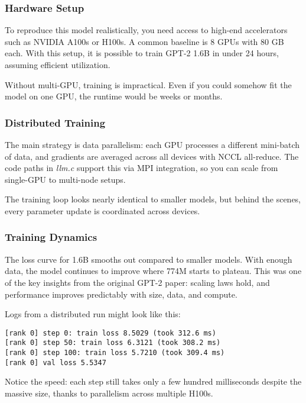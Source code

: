 \documentclass[
  letterpaper,
  DIV=11,
  numbers=noendperiod]{scrreprt}
\begin{document}
\subsubsection{Hardware Setup}\label{hardware-setup}

To reproduce this model realistically, you need access to high-end
accelerators such as NVIDIA A100s or H100s. A common baseline is 8 GPUs
with 80 GB each. With this setup, it is possible to train GPT-2 1.6B in
under 24 hours, assuming efficient utilization.

Without multi-GPU, training is impractical. Even if you could somehow
fit the model on one GPU, the runtime would be weeks or months.

\subsubsection{Distributed Training}\label{distributed-training}

The main strategy is data parallelism: each GPU processes a different
mini-batch of data, and gradients are averaged across all devices with
NCCL all-reduce. The code paths in \emph{llm.c} support this via MPI
integration, so you can scale from single-GPU to multi-node setups.

The training loop looks nearly identical to smaller models, but behind
the scenes, every parameter update is coordinated across devices.

\subsubsection{Training Dynamics}\label{training-dynamics-1}

The loss curve for 1.6B smooths out compared to smaller models. With
enough data, the model continues to improve where 774M starts to
plateau. This was one of the key insights from the original GPT-2 paper:
scaling laws hold, and performance improves predictably with size, data,
and compute.

Logs from a distributed run might look like this:

\begin{verbatim}
[rank 0] step 0: train loss 8.5029 (took 312.6 ms)
[rank 0] step 50: train loss 6.3121 (took 308.2 ms)
[rank 0] step 100: train loss 5.7210 (took 309.4 ms)
[rank 0] val loss 5.5347
\end{verbatim}

Notice the speed: each step still takes only a few hundred milliseconds
despite the massive size, thanks to parallelism across multiple H100s.
\end{document}
